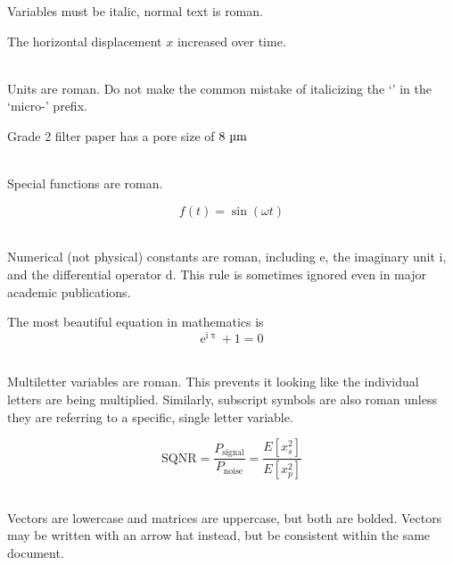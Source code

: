\documentclass{bannerReport}
\begin{document}
				\noindent Variables must be italic, normal text is roman.
				\vspace{-.1cm}
				\begin{dent}
					The horizontal displacement $x$ increased over time.
				\end{dent}
				~\\
				Units are roman. Do not make the common mistake of italicizing the `\textmu'  in the `micro-' prefix.
				\vspace{-.1cm}
				\begin{dent}
					Grade 2 filter paper has a pore size of $8 \text{ \textmu m}$
				\end{dent}
				~\\
				Special functions are roman.
				\vspace{-.1cm}
				\begin{dent}
					\begin{equation*}
						f(t) = \sin(\omega t)
					\end{equation*}
				\end{dent}
				~\\
				Numerical (not physical) constants  are roman, including $\mathrm{e}$, the imaginary unit $\mathrm{i}$, and the differential operator $\mathrm{d}$. This rule is sometimes ignored even in major academic publications.
				\vspace{-.1cm}
				\begin{dent}
					The most beautiful equation in mathematics is
					\begin{equation*}
						\mathrm{e}^{\mathrm{i} \uppi} + 1  = 0
					\end{equation*}
				\end{dent}
				~\\
				\newpage
				\noindent Multiletter variables are roman. This prevents it looking like the individual letters are being multiplied. Similarly, subscript symbols are also roman unless they are referring to a specific, single letter variable.
				\vspace{-.1cm}
				\begin{dent}
					\begin{equation*}
						\mathrm{SQNR} = \dfrac{P_\mathrm{signal}}{P_\mathrm{noise}} = \dfrac{E[x_s^2]}{E[x_p^2]}
					\end{equation*}
				\end{dent}
				~\\
				\noindent Vectors are lowercase and matrices are uppercase, but both are bolded. Vectors may be written with an arrow hat instead, but be consistent within the same document.
\end{document}
